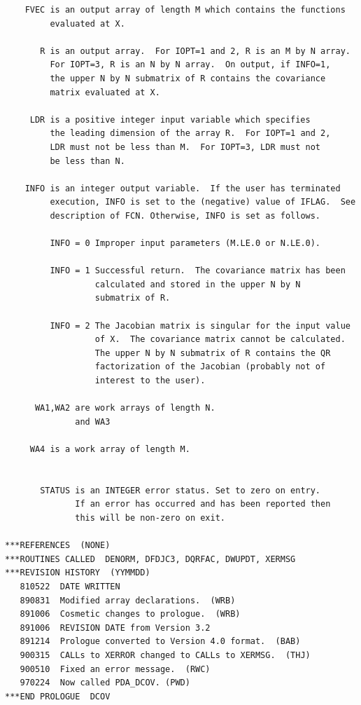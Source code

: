 \documentclass[11pt,twoside]{article}
\begin{document}
\begin{verbatim}
    FVEC is an output array of length M which contains the functions
         evaluated at X.

       R is an output array.  For IOPT=1 and 2, R is an M by N array.
         For IOPT=3, R is an N by N array.  On output, if INFO=1,
         the upper N by N submatrix of R contains the covariance
         matrix evaluated at X.

     LDR is a positive integer input variable which specifies
         the leading dimension of the array R.  For IOPT=1 and 2,
         LDR must not be less than M.  For IOPT=3, LDR must not
         be less than N.

    INFO is an integer output variable.  If the user has terminated
         execution, INFO is set to the (negative) value of IFLAG.  See
         description of FCN. Otherwise, INFO is set as follows.

         INFO = 0 Improper input parameters (M.LE.0 or N.LE.0).

         INFO = 1 Successful return.  The covariance matrix has been
                  calculated and stored in the upper N by N
                  submatrix of R.

         INFO = 2 The Jacobian matrix is singular for the input value
                  of X.  The covariance matrix cannot be calculated.
                  The upper N by N submatrix of R contains the QR
                  factorization of the Jacobian (probably not of
                  interest to the user).

      WA1,WA2 are work arrays of length N.
              and WA3

     WA4 is a work array of length M.


       STATUS is an INTEGER error status. Set to zero on entry.
              If an error has occurred and has been reported then
              this will be non-zero on exit.

***REFERENCES  (NONE)
***ROUTINES CALLED  DENORM, DFDJC3, DQRFAC, DWUPDT, XERMSG
***REVISION HISTORY  (YYMMDD)
   810522  DATE WRITTEN
   890831  Modified array declarations.  (WRB)
   891006  Cosmetic changes to prologue.  (WRB)
   891006  REVISION DATE from Version 3.2
   891214  Prologue converted to Version 4.0 format.  (BAB)
   900315  CALLs to XERROR changed to CALLs to XERMSG.  (THJ)
   900510  Fixed an error message.  (RWC)
   970224  Now called PDA_DCOV. (PWD)
***END PROLOGUE  DCOV
\end{verbatim}

\end{document}

